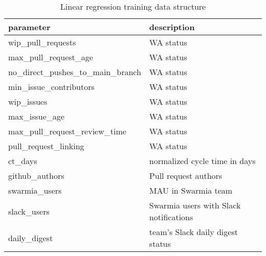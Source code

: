 \begin{table}[h]
\begin{center}
\begin{tabularx}{\textwidth}{ |l|X| } 
\hline
parameter & description \\ [0.5ex] 
\hline\hline
wip\_pull\_requests & WA status \\
max\_pull\_request\_age & WA status \\
no\_direct\_pushes\_to\_main\_branch & WA status \\
min\_issue\_contributors  & WA status \\
wip\_issues & WA status \\
max\_issue\_age  & WA status \\
max\_pull\_request\_review\_time  & WA status \\
pull\_request\_linking  & WA status \\
ct\_days  & normalized cycle time in days \\
github\_authors & Pull request authors \\
swarmia\_users & MAU in Swarmia team \\
slack\_users & Swarmia users with Slack notifications \\
daily\_digest & team's Slack daily digest status \\
\hline
\end{tabularx}
\caption{Linear regression training data structure}
\label{tab:trainingDataStructure}
\end{center}
\end{table}


